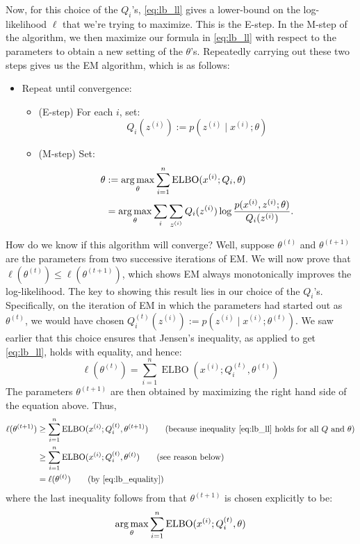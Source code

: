 Now, for this choice of the $Q_i$'s, \cref{eq:lb_ll} gives a lower-bound on
the log-likelihood $\ell$ that we're trying to maximize. This is the E-step. In
the M-step of the algorithm, we then maximize our formula in \cref{eq:lb_ll}
with respect to the parameters to obtain a new setting of the $\theta$'s. Repeatedly
carrying out these two steps gives us the EM algorithm, which is as follows:
\begin{itemize}
    \item Repeat until convergence:
    \begin{itemize}
        \item (E-step) For each $i$, set:
        \begin{equation*}
            Q_i(z^{(i)}) := p(z^{(i)} \mid x^{(i)} ;\theta)
        \end{equation*}
        \item (M-step) Set:
        \begin{align}
            \theta &:= \argmax_\theta \sum_{i=1}^n \operatorname{ELBO}(x^{(i)} ;Q_i ,\theta)\\
                &= \argmax_\theta\sum_{i}\sum_{z^{(i)}} Q_i(z^{(i)})\log \frac{p(x^{(i)} ,z^{(i)} ;\theta)}{Q_i(z^{(i)})}.\label{eq:m_step}
        \end{align}
    \end{itemize}
\end{itemize}

How do we know if this algorithm will converge? Well, suppose $\theta^{(t)}$ and
$\theta^{(t+1)}$ are the parameters from two successive iterations of EM. We will now
prove that $\ell(\theta^{(t)} ) \le \ell(\theta^{(t+1)} )$, which shows EM always monotonically
improves the log-likelihood. The key to showing this result lies in our choice of
the $Q_i$'s. Specifically, on the iteration of EM in which the parameters had
started out as $\theta^{(t)}$, we would have chosen $Q^{(t)}_i (z^{(i)}) := p(z^{(i)} \mid x^{(i)} ;\theta^{(t)} )$.
We saw earlier that this choice ensures that Jensen's inequality, as applied to get
\cref{eq:lb_ll}, holds with equality, and hence:
\begin{equation}
    \ell(\theta^{(t)} ) = \sum_{i=1}^n \operatorname{ELBO}(x^{(i)} ;Q^{(t)}_i,\theta^{(t)} )\label{eq:lb_equality}
\end{equation}
The parameters $\theta^{(t+1)}$ are then obtained by maximizing the right hand side
of the equation above. Thus,
\begin{align*}
    \ell(\theta^{(t+1)} ) &\ge \sum_{i=1}^n \operatorname{ELBO}(x^{(i)} ;Q^{(t)}_i,\theta^{(t+1)}) \tag{because inequality \ref{eq:lb_ll} holds for all $Q$ and $\theta$}\\ %
        &\ge \sum_{i=1}^n \operatorname{ELBO}(x^{(i)} ;Q^{(t)}_i ,\theta^{(t)} ) \tag{see reason below}\\
        &= \ell(\theta^{(t)} ) \tag{by \cref{eq:lb_equality}}
\end{align*}
where the last inequality follows from that $\theta^{(t+1)}$ is chosen explicitly to be:
\begin{equation*}
    \argmax_\theta \sum_{i=1}^n \operatorname{ELBO}(x^{(i)} ;Q^{(t)}_i ,\theta)
\end{equation*}

